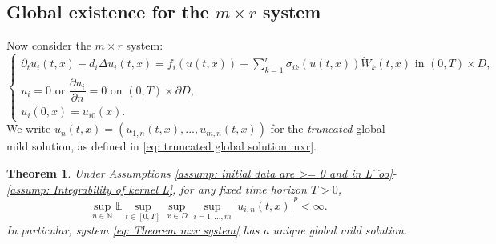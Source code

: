 \documentclass[12pt]{article}
\newtheorem{theorem}{Theorem}[section]
\theoremstyle{definition}
\theoremstyle{remark}
\begin{document}
\subsection{Global existence for the $m\times r$ system}
Now consider the $m\times r$ system:
\begin{equation}\label{eq: Theorem mxr system}
    \begin{cases}
        \partial_t u_i(t,x) - d_i\Delta u_i(t,x) = f_i(u(t,x))+\sum\limits_{k=1}^r \sigma_{ik}(u(t,x))\dot{W}_k(t,x)\text{ in } (0,T)\times D,\\
        u_i = 0 \text{ or } \dfrac{\partial u_i}{\partial n} = 0 \text{ on } (0,T)\times \partial D,\\
        u_i(0,x) = u_{i0}(x).
    \end{cases}
\end{equation}
We write $u_n(t,x) = (u_{1,n}(t,x),...,u_{m,n}(t,x))$ for the \textit{truncated} global mild solution, as defined in \eqref{eq: truncated global solution mxr}.
\begin{theorem}\label{thm: Theorem mxr}
    Under Assumptions \ref{assump: initial data are >= 0 and in L^oo}-\ref{assump: Integrability of kernel L}, for any fixed time horizon $T>0$,
    \begin{equation*}
\sup_{n\in \mathbb N} \mathbb E \sup_{t\in [0,T]}\sup_{x\in D}\sup_{i=1,...,m} |u_{i,n}(t,x)|^p < \infty.
\end{equation*}
In particular, system \eqref{eq: Theorem mxr system} has a unique global mild solution.
\end{theorem}
\end{document}
